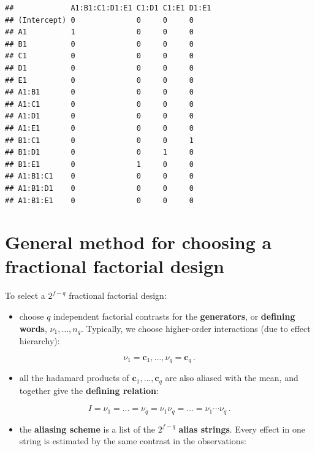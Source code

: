 \documentclass[
]{book}
\providecommand{\tightlist}{%
  \setlength{\itemsep}{0pt}\setlength{\parskip}{0pt}}
\theoremstyle{definition}
\theoremstyle{definition}
\theoremstyle{definition}
\theoremstyle{definition}
\theoremstyle{remark}
\begin{document}
\begin{verbatim}
##             A1:B1:C1:D1:E1 C1:D1 C1:E1 D1:E1
## (Intercept) 0              0     0     0    
## A1          1              0     0     0    
## B1          0              0     0     0    
## C1          0              0     0     0    
## D1          0              0     0     0    
## E1          0              0     0     0    
## A1:B1       0              0     0     0    
## A1:C1       0              0     0     0    
## A1:D1       0              0     0     0    
## A1:E1       0              0     0     0    
## B1:C1       0              0     0     1    
## B1:D1       0              0     1     0    
## B1:E1       0              1     0     0    
## A1:B1:C1    0              0     0     0    
## A1:B1:D1    0              0     0     0    
## A1:B1:E1    0              0     0     0
\end{verbatim}

\hypertarget{general-method-for-choosing-a-fractional-factorial-design}{%
\section{General method for choosing a fractional factorial design}\label{general-method-for-choosing-a-fractional-factorial-design}}

To select a \(2^{f-q}\) fractional factorial design:

\begin{itemize}
\tightlist
\item
  choose \(q\) independent factorial contrasts for the \textbf{generators}, or \textbf{defining words}, \(\nu_1,\ldots,n_q\). Typically, we choose higher-order interactions (due to effect hierarchy):
\end{itemize}

\[
\nu_{1}=\boldsymbol{c}_{1},\ldots,\nu_{q} = \boldsymbol{c}_{q}\,.
\]

\begin{itemize}
\tightlist
\item
  all the hadamard products of \(\boldsymbol{c}_{1},\dots,\boldsymbol{c}_{q}\) are also aliased with the mean, and together give the \textbf{defining relation}:
\end{itemize}

\[
I = \nu_1 = \ldots = \nu_q = \nu_1\nu_q = \ldots = \nu_1\cdots\nu_q\,. 
\]

\begin{itemize}
\tightlist
\item
  the \textbf{aliasing scheme} is a list of the \(2^{f-q}\) \textbf{alias strings}. Every effect in one string is estimated by the same contrast in the observations:
\end{itemize}
\end{document}
